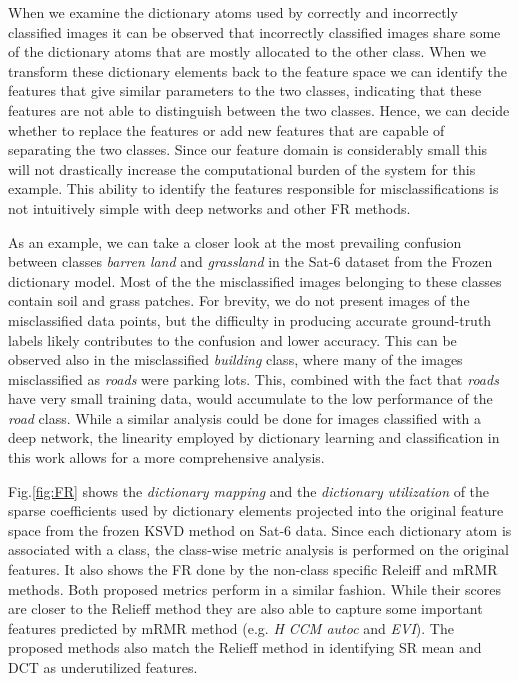 When we examine the dictionary atoms used by correctly and incorrectly classified images it can be observed that incorrectly classified images share some of the dictionary atoms that are mostly allocated to the other class. When we transform these dictionary elements back to the feature space we can identify the features that give similar parameters to the two classes, indicating that these features are not able to distinguish between the two classes. Hence, we can decide whether to replace the features or add new features that are capable of separating the two classes. Since our feature domain is considerably small this will not drastically increase the computational burden of the system for this example. This ability to identify the features responsible for misclassifications is not intuitively simple with deep networks and other FR methods. 

As an example, we can take a closer look at the most prevailing confusion between classes \textit{barren land} and \textit{grassland} in the Sat-6 dataset from the Frozen dictionary model. Most of the the misclassified images belonging to these classes contain soil and grass patches. For brevity, we do not present images of the misclassified data points, but the difficulty in producing accurate ground-truth labels likely contributes to the confusion and lower accuracy. This can be observed also in the misclassified \textit{building} class, where many of the images misclassified as \textit{roads} were parking lots. This, combined with the fact that \textit{roads} have very small training data, would accumulate to the low performance of the \textit{road} class. While a similar analysis could be done for images classified with a deep network, the linearity employed by dictionary learning and classification in this work allows for a more comprehensive analysis. 

Fig.\ref{fig:FR} shows the \textit{dictionary mapping} and the \textit{dictionary utilization} of the sparse coefficients used by dictionary elements projected into the original feature space from the frozen KSVD method on Sat-6 data. Since each dictionary atom is associated with a class, the class-wise metric analysis is performed on the original features. It also shows the FR done by the non-class specific Releiff and mRMR methods. Both proposed metrics perform in a similar fashion. While their scores are closer to the Relieff method they are also able to capture some important features predicted by mRMR method (e.g. \textit{H CCM autoc} and \textit{EVI}). The proposed methods also match the Relieff method in identifying SR mean and DCT as underutilized features.

